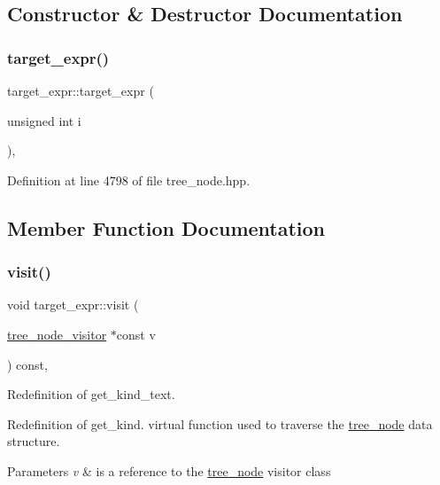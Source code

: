 \subsection{Constructor \& Destructor Documentation}
\mbox{\label{structtarget__expr_a207afc5e6f0b265a2928ceda90e485ab}} 
\subsubsection{\texorpdfstring{target\+\_\+expr()}{target\_expr()}}
{\footnotesize\ttfamily target\+\_\+expr\+::target\+\_\+expr (\begin{DoxyParamCaption}\item[{unsigned int}]{i }\end{DoxyParamCaption})\hspace{0.3cm}{\ttfamily [inline]}, {\ttfamily [explicit]}}



Definition at line 4798 of file tree\+\_\+node.\+hpp.



\subsection{Member Function Documentation}
\mbox{\label{structtarget__expr_a69a7da18ea0d8b008cec659f2a24b63e}} 
\subsubsection{\texorpdfstring{visit()}{visit()}}
{\footnotesize\ttfamily void target\+\_\+expr\+::visit (\begin{DoxyParamCaption}\item[{\hyperlink{classtree__node__visitor}{tree\+\_\+node\+\_\+visitor} $\ast$const}]{v }\end{DoxyParamCaption}) const\hspace{0.3cm}{\ttfamily [override]}, {\ttfamily [virtual]}}



Redefinition of get\+\_\+kind\+\_\+text. 

Redefinition of get\+\_\+kind. virtual function used to traverse the \hyperlink{classtree__node}{tree\+\_\+node} data structure. 
\begin{DoxyParams}{Parameters}
{\em v} & is a reference to the \hyperlink{classtree__node}{tree\+\_\+node} visitor class \\
\hline
\end{DoxyParams}


